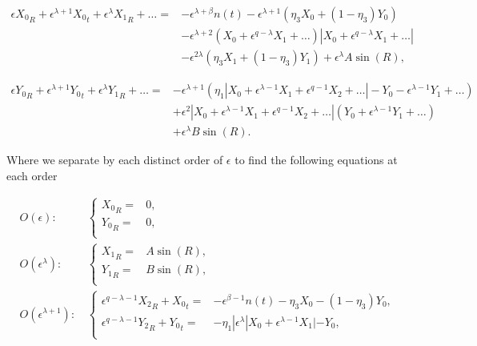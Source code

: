\begin{equation*}
\begin{aligned}
\epsilon {X_0}_R+\epsilon^{\lambda+1}{X_0}_t+\epsilon^\lambda {X_1}_R+\ldots={} & -\epsilon^{\lambda+\beta}n(t)-\epsilon^{\lambda+1} (\eta_3X_0+(1-\eta_3)Y_0) \\
&-\epsilon^{\lambda+2}(X_0+\epsilon^{q-\lambda} X_1+\ldots)|X_0+\epsilon^{q-\lambda} X_1+\ldots|\\
& - \epsilon^{2\lambda}(\eta_3X_1+(1-\eta_3)Y_1) + \epsilon^\lambda A\sin(R),
\end{aligned}
\end{equation*}

\begin{equation*}
\begin{aligned}
\epsilon {Y_0}_R+\epsilon^{\lambda+1}{Y_0}_t+\epsilon^\lambda {Y_1}_R+\ldots=& -\epsilon^{\lambda+1}(\eta_1|X_0 +\epsilon^{\lambda-1} X_1+\epsilon^{q-1} X_2+\ldots|- Y_0-\epsilon^{\lambda-1} Y_1+\ldots)\\
&+\epsilon^2|X_0 +\epsilon^{\lambda-1} X_1+\epsilon^{q-1} X_2+\ldots|(Y_0 +\epsilon^{\lambda-1} Y_1+\ldots)\\
&+\epsilon^\lambda B \sin (R).
\end{aligned}
\end{equation*}

Where we separate by each distinct order of $\epsilon$ to find the following equations at each order

\begin{align} \label{eq:twoD_slowosc_caseII_O1}
O(\epsilon):\, &\begin{cases}
	{X_0}_R =&  0, \\
	{Y_0}_R =&  0,\\
\end{cases}\\ \label{eq:twoD_slowosc_caseII_O2}
O(\epsilon^\lambda): \, & \begin{cases}
	{X_1}_R =&  A\sin(R), \\
	{Y_1}_R =&  B\sin(R),\\
\end{cases}\\
\label{eq:twoD_slowosc_caseII_O3}
O(\epsilon^{\lambda+1}):\, &\begin{cases}
	\epsilon^{q-\lambda-1}{X_2}_R+{X_0}_t =&  -\epsilon^{\beta-1}n(t)-\eta_3X_0-(1-\eta_3)Y_0, \\
	\epsilon^{q-\lambda-1}{Y_2}_R+{Y_0}_t =&  -\eta_1|\epsilon^{\lambda}|X_0+\epsilon^{\lambda-1}X_1|-Y_0,\\
\end{cases}
\end{align}

